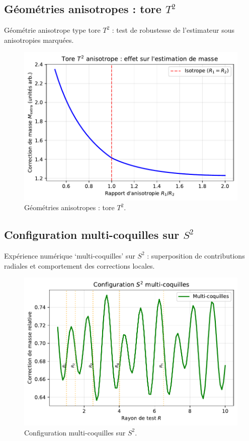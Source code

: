 \documentclass[11pt,a4paper]{article}
\begin{document}
\medskip

\subsection*{Géométries anisotropes : tore $T^2$}
Géométrie anisotrope type tore $T^2$ : test de robustesse de l’estimateur sous anisotropies marquées.

\begin{figure}[htbp]
  \centering
  \includegraphics[width=\linewidth]{fig_torus_anisotropic.pdf}
  \caption{Géométries anisotropes : tore $T^2$.}
  \label{fig:fig_torus_anisotropic}
\end{figure}

\medskip

\subsection*{Configuration multi-coquilles sur $S^2$}
Expérience numérique ‘multi-coquilles’ sur $S^2$ : superposition de contributions radiales et comportement des corrections locales.

\begin{figure}[htbp]
  \centering
  \includegraphics[width=\linewidth]{fig_sphere_multishell.pdf}
  \caption{Configuration multi-coquilles sur $S^2$.}
  \label{fig:fig_sphere_multishell}
\end{figure}
\end{document}
